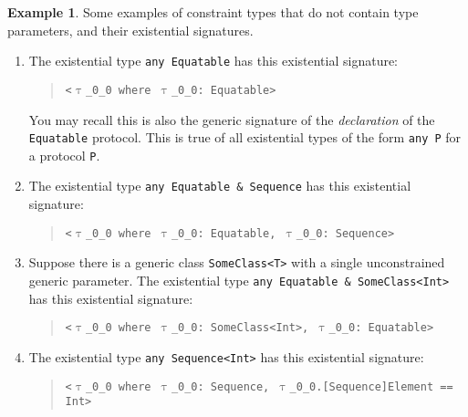 \documentclass[a4paper,headsepline,bibliography=totoc,toc=flat,fleqn,twoside=semi]{scrbook}
\theoremstyle{definition}
\theoremstyle{definition}
\newtheorem{example}{Example}[chapter]
\theoremstyle{definition}
\newcommand{\ttgp}[2]{\texttt{$\uptau$\_#1\_#2}}
\begin{document}
\begin{example}\label{existentialsigexample}
Some examples of constraint types that do not contain type parameters, and their existential signatures.
\begin{enumerate}
\item The existential type \texttt{any Equatable} has this existential signature:
\begin{quote}
\texttt{<\ttgp{0}{0} where \ttgp{0}{0}:\ Equatable>}
\end{quote}
You may recall this is also the generic signature of the \emph{declaration} of the \texttt{Equatable} protocol. This is true of all existential types of the form \texttt{any P} for a protocol \texttt{P}.

\item The existential type \texttt{any Equatable \& Sequence} has this existential signature:
\begin{quote}
\texttt{<\ttgp{0}{0} where \ttgp{0}{0}:\ Equatable, \ttgp{0}{0}:\ Sequence>}
\end{quote}

\item Suppose there is a generic class \texttt{SomeClass<T>} with a single unconstrained generic parameter. The existential type \texttt{any Equatable \& SomeClass<Int>} has this existential signature:
\begin{quote}
\texttt{<\ttgp{0}{0} where \ttgp{0}{0}:\ SomeClass<Int>, \ttgp{0}{0}:\ Equatable>}
\end{quote}

\item The existential type \texttt{any Sequence<Int>} has this existential signature:
\begin{quote}
\texttt{<\ttgp{0}{0} where \ttgp{0}{0}:\ Sequence, \ttgp{0}{0}.[Sequence]Element == Int>}
\end{quote}
\end{enumerate}
\end{example}
\end{document}
